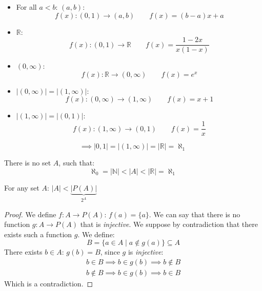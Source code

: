 \documentclass[00_complete]{subfiles}
\begin{document}
\begin{itemize}
    \item For all $a<b$: $(a,b)$:
    $$f(x):(0,1)\to (a,b) \qquad f(x)=(b-a)x+a$$
    \item $\mathbb{R}$:
    $$f(x):(0,1)\to \mathbb{R} \qquad f(x)=\frac{1-2x}{x(1-x)}$$
    \item $(0, \infty)$:
    $$f(x):\mathbb{R}\to (0,\infty) \qquad f(x)=e^x$$
    \item $|(0,\infty)|=|(1,\infty)|$:
    $$f(x):(0,\infty)\to (1,\infty) \qquad f(x)=x+1$$
    \item $|(1,\infty)|=|(0,1)|$:
    $$f(x):(1,\infty)\to (0,1) \qquad f(x)=\frac{1}{x}$$
\end{itemize}
$$\implies |0,1| = |(1,\infty)|=|\mathbb{R}| = \aleph_1$$
\begin{claim}
    There is no set $A$, such that:
    $$\aleph_0 =|\mathbb{N}|<|A|<|\mathbb{R}|=\aleph_1$$
\end{claim}
\begin{theorem}
    For any set $A$: $|A|<\underbrace{|P(A)|}_{2^A}$
\end{theorem}
\begin{proof}
    We define $f:A \to P(A)$: $f(a)=\{a\}$. We can say that there is no
    function $g: A \to P(A)$ that is \emph{injective}. We suppose by
    contradiction that there exists such a function $g$. We define:
    $$B=\{a \in A \mid a \notin g(a)\} \subseteq A$$
    There exists $b \in A$: $g(b)=B$, since $g$ is \emph{injective}:
    \begin{gather*}
        b \in B \implies b \in g(b) \implies b \notin B \\
        b \notin B \implies b \in g(b) \implies b \in B
    \end{gather*}
    Which is a contradiction.
\end{proof}
\end{document}
